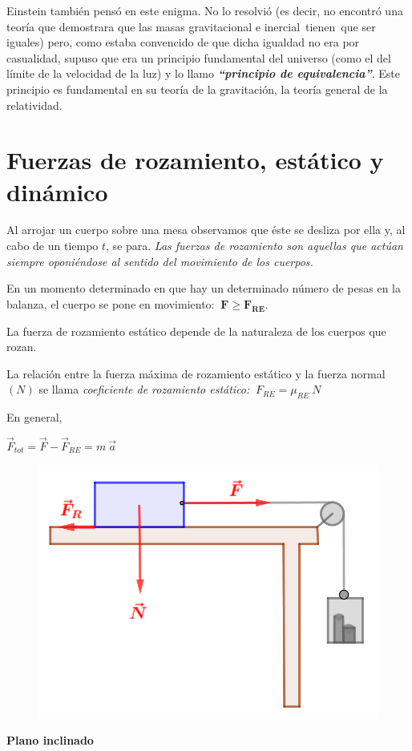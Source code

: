 Einstein también pensó en este enigma. No lo resolvió (es decir, no encontró una teoría que demostrara que las masas gravitacional e inercial tienen que ser iguales) pero, como estaba convencido de que dicha igualdad no era por casualidad, supuso que era un principio fundamental del universo (como el del límite de la velocidad de la luz) y lo llamo \textbf{\emph{``principio de equivalencia''}}. Este principio es fundamental en su teoría de la gravitación, la teoría general de la relatividad.

		
\section[Fuerzas de rozamiento, estático y dinámico]{Fuerzas de rozamiento, estático y dinámico }

Al arrojar un cuerpo sobre una mesa observamos que	éste se desliza por ella y, al cabo de un tiempo	 $t$, se para. \emph{Las fuerzas de rozamiento son aquellas que actúan siempre oponiéndose al sentido del movimiento de los cuerpos.}

En un momento determinado en que hay un determinado número de pesas en la balanza, el cuerpo se pone en movimiento: $\ \boldsymbol{F\ge F_{RE}}$.

\begin{multicols}{2}

La fuerza de rozamiento estático depende de la naturaleza de los cuerpos que rozan.

La relación entre la fuerza máxima de rozamiento estático y la fuerza normal $(N)$ se llama \emph{coeficiente de rozamiento estático:} $\ F_{RE}=\mu_{RE}\ N$

En general,

$\vec F_{tot}=\vec F-\vec F_{RE}=m\ \vec a$

\begin{figure}[H]
		\centering
		\includegraphics[width=.3\textwidth]{imagenes/imagenes03/T03IM48.png}
		\end{figure}		
\end{multicols}		
		
\textbf{Plano inclinado}
		
